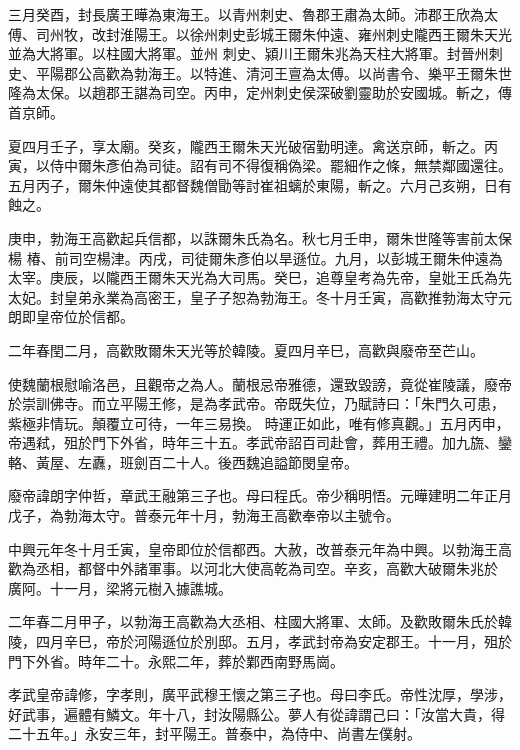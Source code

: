 \begin{pinyinscope}
 三月癸酉，封長廣王曄為東海王。以青州刺史、魯郡王肅為太師。沛郡王欣為太傅、司州牧，改封淮陽王。以徐州刺史彭城王爾朱仲遠、雍州刺史隴西王爾朱天光並為大將軍。以柱國大將軍。並州
 刺史、潁川王爾朱兆為天柱大將軍。封晉州刺史、平陽郡公高歡為勃海王。以特進、清河王亶為太傅。以尚書令、樂平王爾朱世隆為太保。以趙郡王諶為司空。丙申，定州刺史侯深破劉靈助於安國城。斬之，傳首京師。



 夏四月壬子，享太廟。癸亥，隴西王爾朱天光破宿勤明達。禽送京師，斬之。丙寅，以侍中爾朱彥伯為司徒。詔有司不得復稱偽梁。罷細作之條，無禁鄰國還往。五月丙子，爾朱仲遠使其都督魏僧勖等討崔祖螭於東陽，斬之。六月己亥朔，日有蝕之。



 庚申，勃海王高歡起兵信都，以誅爾朱氏為名。秋七月壬申，爾朱世隆等害前太保楊
 椿、前司空楊津。丙戌，司徒爾朱彥伯以旱遜位。九月，以彭城王爾朱仲遠為太宰。庚辰，以隴西王爾朱天光為大司馬。癸巳，追尊皇考為先帝，皇妣王氏為先太妃。封皇弟永業為高密王，皇子子恕為勃海王。冬十月壬寅，高歡推勃海太守元朗即皇帝位於信都。



 二年春閏二月，高歡敗爾朱天光等於韓陵。夏四月辛巳，高歡與廢帝至芒山。



 使魏蘭根慰喻洛邑，且觀帝之為人。蘭根忌帝雅德，還致毀謗，竟從崔陵議，廢帝於崇訓佛寺。而立平陽王修，是為孝武帝。帝既失位，乃賦詩曰：「朱門久可患，紫極非情玩。顛覆立可待，一年三易換。
 時運正如此，唯有修真觀。」五月丙申，帝遇弒，殂於門下外省，時年三十五。孝武帝詔百司赴會，葬用王禮。加九旒、鑾輅、黃屋、左纛，班劍百二十人。後西魏追謚節閔皇帝。



 廢帝諱朗字仲哲，章武王融第三子也。母曰程氏。帝少稱明悟。元曄建明二年正月戊子，為勃海太守。普泰元年十月，勃海王高歡奉帝以主號令。



 中興元年冬十月壬寅，皇帝即位於信都西。大赦，改普泰元年為中興。以勃海王高歡為丞相，都督中外諸軍事。以河北大使高乾為司空。辛亥，高歡大破爾朱兆於
 廣阿。十一月，梁將元樹入據譙城。



 二年春二月甲子，以勃海王高歡為大丞相、柱國大將軍、太師。及歡敗爾朱氏於韓陵，四月辛巳，帝於河陽遜位於別邸。五月，孝武封帝為安定郡王。十一月，殂於門下外省。時年二十。永熙二年，葬於鄴西南野馬崗。



 孝武皇帝諱修，字孝則，廣平武穆王懷之第三子也。母曰李氏。帝性沈厚，學涉，好武事，遍體有鱗文。年十八，封汝陽縣公。夢人有從諱謂己曰：「汝當大貴，得二十五年。」永安三年，封平陽王。普泰中，為侍中、尚書左僕射。




\end{pinyinscope}
